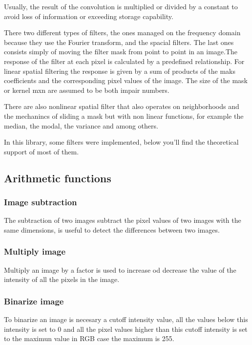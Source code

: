 \documentclass[a4paper]{article}
\begin{document}
Usually, the result of the convolution is multiplied or divided by a constant to avoid loss of information or exceeding storage capability.

There two different types of filters, the ones managed on the frequency domain because they use the Fourier transform, and the spacial filters. The last ones consists simply of moving the filter mask from point to point in an image.The response of the filter at each pixel is calculated by a predefined relationship. For linear spatial filtering  the response is given by a sum of products of the maks coefficients and the corresponding pixel values of the image. The size of the mask or kernel mxn are assumed to be both impair numbers.

There are also nonlinear spatial filter that also operates on neighborhoods and the mechanincs of sliding a mask but with non linear functions, for example the median, the modal, the variance and among others.

In this library, some filters were implemented, below you'll find the theoretical support of most of them.

\subsection{Arithmetic functions}

\subsubsection{Image subtraction}
The subtraction of two images subtract the pixel values of two images with the same dimensions, is useful to detect the differences between two images. 

\subsubsection{Multiply image}
Multiply an image by a factor is used to increase od decrease the value of the intensity of all the pixels in the image.

\subsubsection{Binarize image}
To binarize an image is necesary a cutoff intensity value, all the values below this intensity is set to 0 and all the pixel values higher than this cutoff intensity is set to the maximun value in RGB case the maximum is 255.
\end{document}
